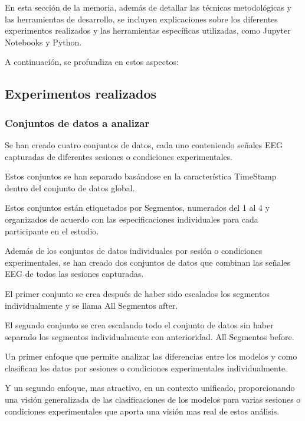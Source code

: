 

En esta sección de la memoria, además de detallar las técnicas metodológicas y las herramientas de desarrollo, se incluyen explicaciones sobre los diferentes experimentos realizados y las herramientas específicas utilizadas, como Jupyter Notebooks y Python. 

A continuación, se profundiza en estos aspectos:


\subsection{Experimentos realizados}



\subsubsection{Conjuntos de datos a analizar}

Se han creado cuatro conjuntos de datos, cada uno conteniendo señales EEG capturadas de diferentes sesiones o condiciones experimentales.

Estos conjuntos se han separado basándose en la característica TimeStamp dentro del conjunto de datos global.

Estos conjuntos están etiquetados por Segmentos, numerados del 1 al 4 y organizados de acuerdo con las especificaciones individuales para cada participante en el estudio.


Además de los conjuntos de datos individuales por sesión o condiciones experimentales, se han creado dos conjuntos de datos que combinan las señales EEG de todos las sesiones capturadas.

El primer conjunto se crea después de haber sido escalados los segmentos individualmente y se llama All Segmentos after.

El segundo conjunto se crea escalando todo el conjunto de datos sin haber separado los segmentos individualmente con anterioridad. All Segmentos before.


Un primer enfoque que permite analizar las diferencias entre los modelos y como clasifican los datos por sesiones o condiciones experimentales individualmente.

Y un segundo enfoque, mas atractivo, en un contexto unificado, proporcionando una visión generalizada de las clasificaciones de los modelos para varias sesiones o condiciones experimentales que aporta una visión mas real de estos análisis.


